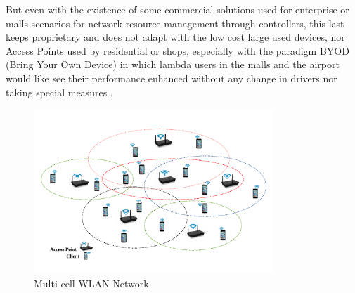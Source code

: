 \documentclass[journal,transmag]{IEEEtran}
\begin{document}
But even with the existence of some commercial solutions used for enterprise or malls scenarios for network resource management through controllers, this last keeps proprietary and does not adapt with the low cost large used devices, nor Access Points used by residential or shops, especially with the paradigm BYOD (Bring Your Own Device) in which lambda users in the malls and the airport would like see their performance enhanced without any change in drivers nor taking special measures \cite{15OpenSDWN_home_entreprise_WIFI,17QOS_AP_selection}. \\

\begin{figure}[t]
\centering
\includegraphics[width=9cm]{Figures/Dense_WLAN.pdf}
\caption{Multi cell WLAN Network}
\label{multi_cell_WLAN}
\end{figure}
\end{document}
